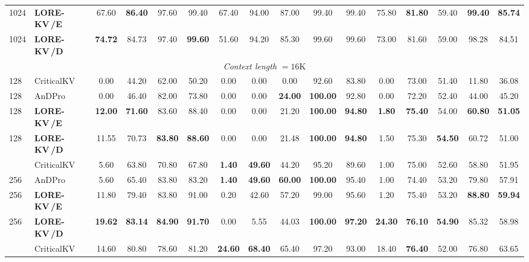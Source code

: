 \documentclass{article} %
\newcommand{\best}[1]{\textcolor{bestblue}{\textbf{#1}}}
\newcommand{\second}[1]{\textcolor{secondorange}{#1}}
\newcommand{\lorekvE}{LORE-KV\,/E}
\newcommand{\lorekvD}{LORE-KV\,/D}
\begin{document}
\begin{table}[p]
{\begin{tabular}{llcccccccccccccc}
1024 & \textbf{\lorekvE} & \second{67.60} & \best{86.40} & \second{97.60} & \second{99.40} & \second{67.40} & 94.00 & \second{87.00} & 99.40 & 99.40 & \second{75.80} & \best{81.80} & \second{59.40} & \best{99.40} & \best{85.74} \\
1024 & \textbf{\lorekvD} & \best{74.72} & \second{84.73} & 97.40 & \best{99.60} & 51.60 & \second{94.20} & 85.30 & \second{99.60} & \second{99.60} & 73.00 & \second{81.60} & 59.00 & \second{98.28} & 84.51 \\
\midrule
\multicolumn{16}{c}{\textit{Context length} $=16$K} \\
\midrule
128 & CriticalKV & 0.00 & 44.20 & 62.00 & 50.20 & 0.00 & 0.00 & 0.00 & \second{92.60} & 83.80 & 0.00 & 73.00 & 51.40 & 11.80 & 36.08 \\
128 & AnDPro & 0.00 & 46.40 & 82.00 & 73.80 & 0.00 & 0.00 & \best{24.00} & \best{100.00} & \second{92.80} & 0.00 & 72.20 & 52.40 & 44.00 & 45.20 \\
128 & \textbf{\lorekvE} & \best{12.00} & \best{71.60} & \second{83.60} & \second{88.40} & 0.00 & 0.00 & 21.20 & \best{100.00} & \best{94.80} & \best{1.80} & \best{75.40} & \second{54.00} & \best{60.80} & \best{51.05} \\
128 & \textbf{\lorekvD} & \second{11.55} & \second{70.73} & \best{83.80} & \best{88.60} & 0.00 & 0.00 & \second{21.48} & \best{100.00} & \best{94.80} & \second{1.50} & \second{75.30} & \best{54.50} & \second{60.72} & \second{51.00} \\
\addlinespace[2pt]
256 & CriticalKV & 5.60 & 63.80 & 70.80 & 67.80 & \best{1.40} & \best{49.60} & 44.20 & 95.20 & 89.60 & 1.00 & 75.00 & 52.60 & 58.80 & 51.95 \\
256 & AnDPro & 5.60 & 65.40 & \second{83.80} & 83.20 & \best{1.40} & \best{49.60} & \best{60.00} & \best{100.00} & 95.40 & 1.00 & 74.40 & \second{53.20} & 79.80 & 57.91 \\
256 & \textbf{\lorekvE} & \second{11.80} & \second{79.40} & \second{83.80} & \second{91.00} & \second{0.20} & \second{42.60} & \second{57.20} & \second{99.00} & \second{95.60} & \second{1.20} & \second{75.40} & \second{53.20} & \best{88.80} & \best{59.94} \\
256 & \textbf{\lorekvD} & \best{19.62} & \best{83.14} & \best{84.90} & \best{91.70} & 0.00 & 5.55 & 44.03 & \best{100.00} & \best{97.20} & \best{24.30} & \best{76.10} & \best{54.90} & \second{85.32} & \second{58.98} \\
\addlinespace[2pt]
512 & CriticalKV & 14.60 & 80.80 & 78.60 & 81.20 & \best{24.60} & \best{68.40} & 65.40 & 97.20 & 93.00 & \second{18.40} & \best{76.40} & 52.00 & 76.80 & 63.65 \\

\end{tabular}}
\end{table}
\end{document}
